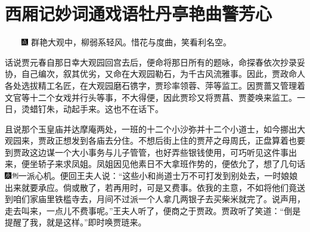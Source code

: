 

\chapter{西厢记妙词通戏语\hspace{.5em}牡丹亭艳曲警芳心}
{　　\includegraphics[width=3mm]{../Images/00005}  \kaishu 群艳大观中，柳弱系轻风。惜花与度曲，笑看利名空。}

话说贾元春自那日幸大观园回宫去后，便命将那日所有的题咏，命探春依次抄录妥协，自己编次，叙其优劣，又命在大观园勒石，为千古风流雅事。因此，贾政命人各处选拔精工名匠，在大观园磨石镌字，贾珍率领蓉、萍等监工。因贾蔷又管理着文官等十二个女戏并行头等事，不大得便，因此贾珍又将贾菖、贾菱唤来监工。一日，烫蜡钉朱，动起手来。这也不在话下。

且说那个玉皇庙并达摩庵两处，一班的十二个小沙弥并十二个小道士，如今挪出大观园来，贾政正想发到各庙去分住。不想后街上住的贾芹之母周氏，正盘算着也要到贾政这边谋一个大小事务与儿子管管，也好弄些银钱使用，可巧听见这件事出来，便坐轿子来求凤姐。凤姐因见他素日不大拿班作势的，便依允了，想了几句话{\includegraphics[width=3mm]{../Images/00004}\includegraphics[width=3mm]{../Images/00011}\footnotesize \kaishu 一派心机。}便回王夫人说：“这些小和尚道士万不可打发到别处去，一时娘娘出来就要承应。倘或散了，若再用时，可是又费事。依我的主意，不如将他们竟送到咱们家庙里铁槛寺去，月间不过派一个人拿几两银子去买柴米就完了。说声用，走去叫来，一点儿不费事呢。”王夫人听了，便商之于贾政。贾政听了笑道：“倒是提醒了我，就是这样。”即时唤贾琏来。

